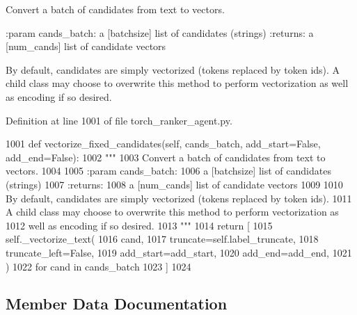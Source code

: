 \begin{DoxyVerb}Convert a batch of candidates from text to vectors.

:param cands_batch:
    a [batchsize] list of candidates (strings)
:returns:
    a [num_cands] list of candidate vectors

By default, candidates are simply vectorized (tokens replaced by token ids).
A child class may choose to overwrite this method to perform vectorization as
well as encoding if so desired.
\end{DoxyVerb}
 

Definition at line 1001 of file torch\+\_\+ranker\+\_\+agent.\+py.


\begin{DoxyCode}
1001     \textcolor{keyword}{def }vectorize\_fixed\_candidates(self, cands\_batch, add\_start=False, add\_end=False):
1002         \textcolor{stringliteral}{"""}
1003 \textcolor{stringliteral}{        Convert a batch of candidates from text to vectors.}
1004 \textcolor{stringliteral}{}
1005 \textcolor{stringliteral}{        :param cands\_batch:}
1006 \textcolor{stringliteral}{            a [batchsize] list of candidates (strings)}
1007 \textcolor{stringliteral}{        :returns:}
1008 \textcolor{stringliteral}{            a [num\_cands] list of candidate vectors}
1009 \textcolor{stringliteral}{}
1010 \textcolor{stringliteral}{        By default, candidates are simply vectorized (tokens replaced by token ids).}
1011 \textcolor{stringliteral}{        A child class may choose to overwrite this method to perform vectorization as}
1012 \textcolor{stringliteral}{        well as encoding if so desired.}
1013 \textcolor{stringliteral}{        """}
1014         \textcolor{keywordflow}{return} [
1015             self.\_vectorize\_text(
1016                 cand,
1017                 truncate=self.label\_truncate,
1018                 truncate\_left=\textcolor{keyword}{False},
1019                 add\_start=add\_start,
1020                 add\_end=add\_end,
1021             )
1022             \textcolor{keywordflow}{for} cand \textcolor{keywordflow}{in} cands\_batch
1023         ]
1024 \end{DoxyCode}


\subsection{Member Data Documentation}
\mbox{\label{classparlai_1_1core_1_1torch__ranker__agent_1_1TorchRankerAgent_af54615af2f53a06df8fb046492f1ec38}} 
